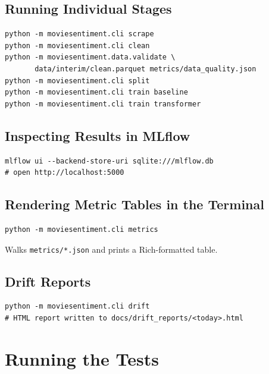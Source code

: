 \documentclass[11pt,a4paper]{article}
\begin{document}
\subsection{Running Individual Stages}

\begin{lstlisting}
python -m moviesentiment.cli scrape
python -m moviesentiment.cli clean
python -m moviesentiment.data.validate \
       data/interim/clean.parquet metrics/data_quality.json
python -m moviesentiment.cli split
python -m moviesentiment.cli train baseline
python -m moviesentiment.cli train transformer
\end{lstlisting}

\subsection{Inspecting Results in MLflow}

\begin{lstlisting}
mlflow ui --backend-store-uri sqlite:///mlflow.db
# open http://localhost:5000
\end{lstlisting}

\subsection{Rendering Metric Tables in the Terminal}

\begin{lstlisting}
python -m moviesentiment.cli metrics
\end{lstlisting}

\noindent Walks \texttt{metrics/*.json} and prints a Rich-formatted table.

\subsection{Drift Reports}

\begin{lstlisting}
python -m moviesentiment.cli drift
# HTML report written to docs/drift_reports/<today>.html
\end{lstlisting}

\section{Running the Tests}
\end{document}
